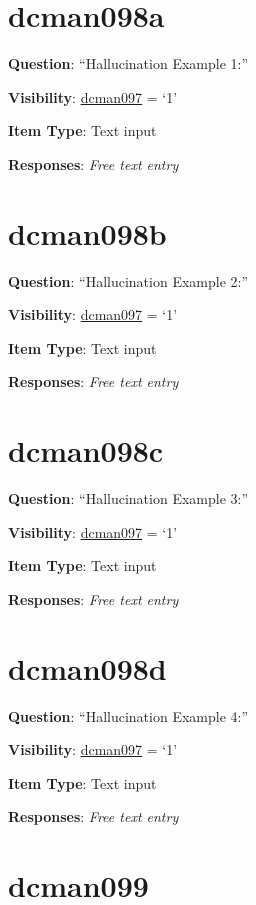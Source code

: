 \documentclass[]{book}
\begin{document}
\hypertarget{dcman098a}{%
\section{dcman098a}\label{dcman098a}}

\textbf{Question}: ``Hallucination Example 1:''

\textbf{Visibility}: \protect\hyperlink{dcman097}{dcman097} = `1'

\textbf{Item Type}: Text input

\textbf{Responses}: \emph{Free text entry}

\hypertarget{dcman098b}{%
\section{dcman098b}\label{dcman098b}}

\textbf{Question}: ``Hallucination Example 2:''

\textbf{Visibility}: \protect\hyperlink{dcman097}{dcman097} = `1'

\textbf{Item Type}: Text input

\textbf{Responses}: \emph{Free text entry}

\hypertarget{dcman098c}{%
\section{dcman098c}\label{dcman098c}}

\textbf{Question}: ``Hallucination Example 3:''

\textbf{Visibility}: \protect\hyperlink{dcman097}{dcman097} = `1'

\textbf{Item Type}: Text input

\textbf{Responses}: \emph{Free text entry}

\hypertarget{dcman098d}{%
\section{dcman098d}\label{dcman098d}}

\textbf{Question}: ``Hallucination Example 4:''

\textbf{Visibility}: \protect\hyperlink{dcman097}{dcman097} = `1'

\textbf{Item Type}: Text input

\textbf{Responses}: \emph{Free text entry}

\hypertarget{dcman099}{%
\section{dcman099}\label{dcman099}}
\end{document}
